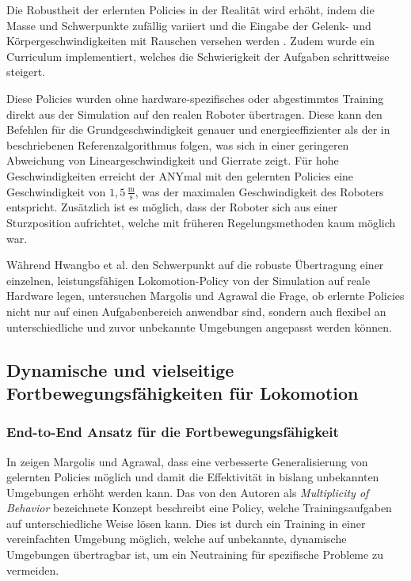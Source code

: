 Die Robustheit der erlernten Policies in der Realität wird erhöht, indem die Masse und Schwerpunkte zufällig variiert und die Eingabe der Gelenk- und Körpergeschwindigkeiten mit Rauschen versehen werden \cite{hwangboLearningAgileDynamic2019}. Zudem wurde ein Curriculum implementiert, welches die Schwierigkeit der Aufgaben schrittweise steigert.

Diese Policies wurden ohne hardware-spezifisches oder abgestimmtes Training direkt aus der Simulation auf den realen Roboter übertragen. Diese kann den Befehlen für die Grundgeschwindigkeit genauer und energieeffizienter als der in \cite{hwangboLearningAgileDynamic2019} beschriebenen Referenzalgorithmus folgen, was sich in einer geringeren Abweichung von Lineargeschwindigkeit und Gierrate zeigt. Für hohe Geschwindigkeiten erreicht der ANYmal mit den gelernten Policies eine Geschwindigkeit von $1{,}5\,\frac{\text{m}}{\text{s}}$, was der maximalen Geschwindigkeit des Roboters entspricht. Zusätzlich ist es möglich, dass der Roboter sich aus einer Sturzposition aufrichtet, welche mit früheren Regelungsmethoden kaum möglich war.

Während Hwangbo et al. den Schwerpunkt auf die robuste Übertragung einer einzelnen, leistungsfähigen Lokomotion-Policy von der Simulation auf reale Hardware legen, untersuchen Margolis und Agrawal die Frage, ob erlernte Policies nicht nur auf einen Aufgabenbereich anwendbar sind, sondern auch flexibel an unterschiedliche und zuvor unbekannte Umgebungen angepasst werden können.

\subsection{Dynamische und vielseitige Fortbewegungsfähigkeiten für Lokomotion}

\subsubsection{End-to-End Ansatz für die Fortbewegungsfähigkeit}
In \cite{margolisWalkTheseWays2022} zeigen Margolis und Agrawal, dass eine verbesserte Generalisierung von gelernten Policies möglich und damit die Effektivität in bislang unbekannten Umgebungen erhöht werden kann. Das von den Autoren als \textit{Multiplicity of Behavior} bezeichnete Konzept beschreibt eine Policy, welche Trainingsaufgaben auf unterschiedliche Weise lösen kann. Dies ist durch ein Training in einer vereinfachten Umgebung möglich, welche auf unbekannte, dynamische Umgebungen übertragbar ist, um ein Neutraining für spezifische Probleme zu vermeiden.

